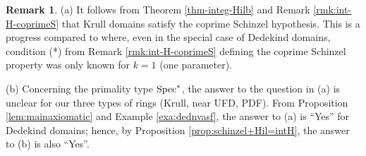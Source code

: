 \documentclass[11pt,a4paper,reqno]{amsart}
\def\Q{\mathbb{Q}}
\newtheorem{cor}[thm]{Corollary}
\theoremstyle{definition}
\newtheorem{rmk}[thm]{Remark}
\begin{document}
\begin{rmk}
(a) It follows from Theorem \ref{thm-integ-Hilb}
and Remark \ref{rmk:int-H-coprimeS} that Krull domains satisfy the coprime Schinzel hypothesis. This is a progress compared to \cite{BDN20b} where, even in the special case of Dedekind domains, condition (*) from Remark \ref{rmk:int-H-coprimeS} defining the coprime Schinzel property was only known for $k=1$ (one parameter).
\vskip 1mm





\noindent
(b) Concerning the primality type ${\rm Spec}^\ast$, the answer to the question in (a) is unclear for our three types of rings (Krull, near UFD, PDF). From Proposition \ref{lem:mainaxiomatic} and Example \ref{exa:dednvasf}, the answer to (a) is ``Yes'' for Dedekind domains; hence,  by Proposition \ref{prop:schinzel+Hil=intH}, the answer to (b) is also ``Yes''.
\end{rmk}

\end{document}
